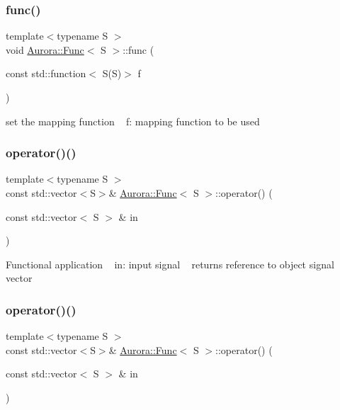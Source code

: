 \subsubsection{\texorpdfstring{func()}{func()}}
{\footnotesize\ttfamily template$<$typename S $>$ \\
void \hyperlink{class_aurora_1_1_func}{Aurora\+::\+Func}$<$ S $>$\+::func (\begin{DoxyParamCaption}\item[{const std\+::function$<$ S(S)$>$}]{f }\end{DoxyParamCaption})\hspace{0.3cm}{\ttfamily [inline]}}

set the mapping function ~\newline
f\+: mapping function to be used \mbox{\label{class_aurora_1_1_func_a60e9dad421d80a9f9eb99cfbac104729}} 
\subsubsection{\texorpdfstring{operator()()}{operator()()}\hspace{0.1cm}{\footnotesize\ttfamily [1/2]}}
{\footnotesize\ttfamily template$<$typename S $>$ \\
const std\+::vector$<$S$>$\& \hyperlink{class_aurora_1_1_func}{Aurora\+::\+Func}$<$ S $>$\+::operator() (\begin{DoxyParamCaption}\item[{const std\+::vector$<$ S $>$ \&}]{in }\end{DoxyParamCaption})\hspace{0.3cm}{\ttfamily [inline]}}

Functional application ~\newline
in\+: input signal ~\newline
returns reference to object signal vector \mbox{\label{class_aurora_1_1_func_a60e9dad421d80a9f9eb99cfbac104729}} 
\subsubsection{\texorpdfstring{operator()()}{operator()()}\hspace{0.1cm}{\footnotesize\ttfamily [2/2]}}
{\footnotesize\ttfamily template$<$typename S $>$ \\
const std\+::vector$<$S$>$\& \hyperlink{class_aurora_1_1_func}{Aurora\+::\+Func}$<$ S $>$\+::operator() (\begin{DoxyParamCaption}\item[{const std\+::vector$<$ S $>$ \&}]{in }\end{DoxyParamCaption})\hspace{0.3cm}{\ttfamily [inline]}}

